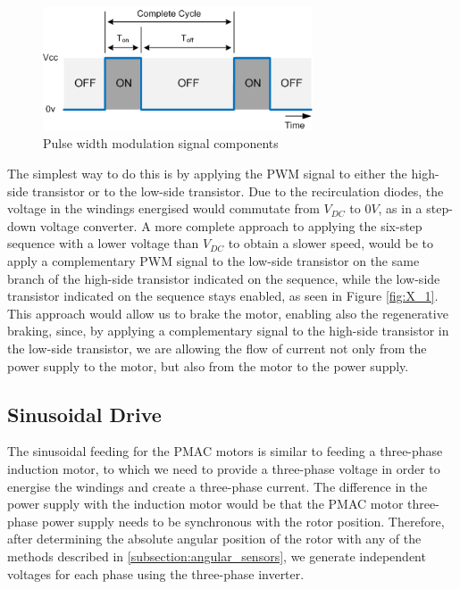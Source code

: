 \begin{figure}[htbp]
\centering
\includegraphics[width=8cm]{Images/dutycycle.png} 
\caption[PWM Signal]{Pulse width modulation signal components}
\label{fig:dutycycle}
\end{figure}

The simplest way to do this is by applying the \ac{PWM} signal to either the high-side transistor or to the low-side transistor. Due to the recirculation diodes, the voltage in the windings energised would commutate from $V_{DC}$ to $0V$, as in a step-down voltage converter. A more complete approach to applying the six-step sequence with a lower voltage than $V_{DC}$ to obtain a slower speed, would be to apply a complementary \ac{PWM} signal to the low-side transistor on the same branch of the high-side transistor indicated on the sequence, while the low-side transistor indicated on the sequence stays enabled, as seen in Figure \ref{fig:X_1}. This approach would allow us to brake the motor, enabling also the regenerative braking, since, by applying a complementary signal to the high-side transistor in the low-side transistor, we are allowing the flow of current not only from the power supply to the motor, but also from the motor to the power supply.

\subsection{Sinusoidal Drive}\label{subsection:sinusoidal_drive}

The sinusoidal feeding for the \ac{PMAC} motors is similar to feeding a three-phase induction motor, to which we need to provide a three-phase voltage in order to energise the windings and create a three-phase current. The difference in the power supply with the induction motor would be that the \ac{PMAC} motor three-phase power supply needs to be synchronous with the rotor position. Therefore, after determining the absolute angular position of the rotor with any of the methods described in \ref{subsection:angular_sensors}, we generate independent voltages for each phase using the three-phase inverter.


